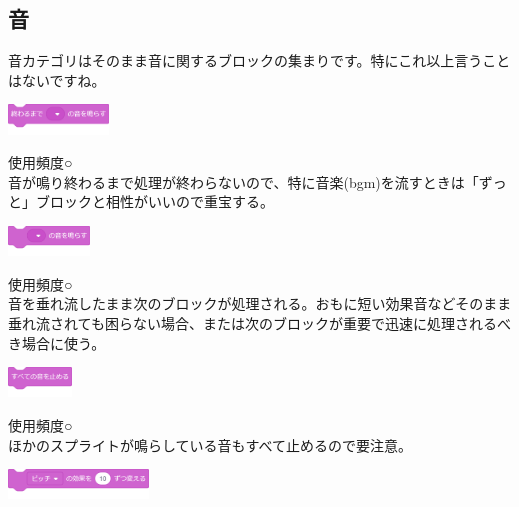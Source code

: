 \documentclass[b5paper,10pt]{jsarticle}
\begin{document}
\begin{multicols*}{3}
\subsection{音}
音カテゴリはそのまま音に関するブロックの集まりです。特にこれ以上言うことはないですね。
\begin{itembox}{1}
\includegraphics[height=8mm]{images/sound_1.png}
\end{itembox}
使用頻度○\\
音が鳴り終わるまで処理が終わらないので、特に音楽(bgm)を流すときは「ずっと」ブロックと相性がいいので重宝する。
\begin{itembox}{2}
\includegraphics[height=8mm]{images/sound_2.png}
\end{itembox}
使用頻度○\\
音を垂れ流したまま次のブロックが処理される。おもに短い効果音などそのまま垂れ流されても困らない場合、または次のブロックが重要で迅速に処理されるべき場合に使う。
\begin{itembox}{3}
\includegraphics[height=8mm]{images/sound_3.png}
\end{itembox}
使用頻度○\\
ほかのスプライトが鳴らしている音もすべて止めるので要注意。
\begin{itembox}{4}
\includegraphics[height=8mm]{images/sound_4.png}


\end{itembox}
\end{multicols*}
\end{document}
